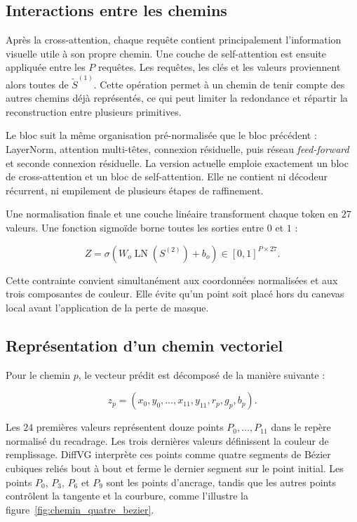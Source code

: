 \documentclass[12pt, a4paper, oneside]{report}
\begin{document}
\subsection{Interactions entre les chemins}

Après la cross-attention, chaque requête contient principalement l'information visuelle utile à son propre chemin. Une couche de self-attention est ensuite appliquée entre les $P$ requêtes. Les requêtes, les clés et les valeurs proviennent alors toutes de $\widetilde{S}^{(1)}$. Cette opération permet à un chemin de tenir compte des autres chemins déjà représentés, ce qui peut limiter la redondance et répartir la reconstruction entre plusieurs primitives.

Le bloc suit la même organisation pré-normalisée que le bloc précédent : LayerNorm, attention multi-têtes, connexion résiduelle, puis réseau \textit{feed-forward} et seconde connexion résiduelle. La version actuelle emploie exactement un bloc de cross-attention et un bloc de self-attention. Elle ne contient ni décodeur récurrent, ni empilement de plusieurs étapes de raffinement.

Une normalisation finale et une couche linéaire transforment chaque token en $27$ valeurs. Une fonction sigmoïde borne toutes les sorties entre $0$ et $1$ :

\begin{equation}
    Z = \sigma\!\left(W_o\operatorname{LN}(S^{(2)}) + b_o\right)
      \in [0,1]^{P \times 27}.
    \label{eq:sortie_decodeur}
\end{equation}

Cette contrainte convient simultanément aux coordonnées normalisées et aux trois composantes de couleur. Elle évite qu'un point soit placé hors du canevas local avant l'application de la perte de masque.

\subsection{Représentation d'un chemin vectoriel}
\label{sec:representation_chemin_propose}

Pour le chemin $p$, le vecteur prédit est décomposé de la manière suivante :

\begin{equation}
    z_p = \left(x_0,y_0,\ldots,x_{11},y_{11},r_p,g_p,b_p\right).
    \label{eq:parametres_chemin}
\end{equation}

Les $24$ premières valeurs représentent douze points $P_0,\ldots,P_{11}$ dans le repère normalisé du recadrage. Les trois dernières valeurs définissent la couleur de remplissage. DiffVG interprète ces points comme quatre segments de Bézier cubiques reliés bout à bout et ferme le dernier segment sur le point initial. Les points $P_0$, $P_3$, $P_6$ et $P_9$ sont les points d'ancrage, tandis que les autres points contrôlent la tangente et la courbure, comme l'illustre la figure~\ref{fig:chemin_quatre_bezier}.
\end{document}
